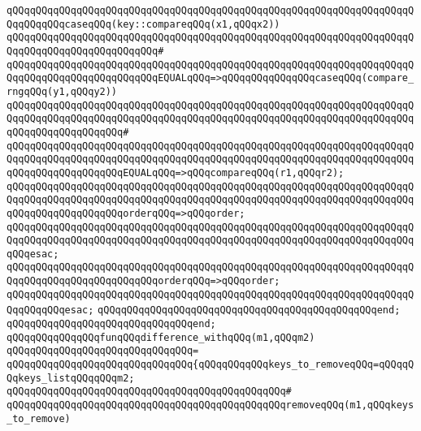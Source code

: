 \verb|qQQqqQQqqQQqqQQqqQQqqQQqqQQqqQQqqQQqqQQqqQQqqQQqqQQqqQQqqQQqqQQqqQQqqQQqqQQqqQQqcaseqQQq(key::compareqQQq(x1,qQQqx2))|\newline
\verb|qQQqqQQqqQQqqQQqqQQqqQQqqQQqqQQqqQQqqQQqqQQqqQQqqQQqqQQqqQQqqQQqqQQqqQQqqQQqqQQqqQQqqQQqqQQqqQQq#|\newline
\verb|qQQqqQQqqQQqqQQqqQQqqQQqqQQqqQQqqQQqqQQqqQQqqQQqqQQqqQQqqQQqqQQqqQQqqQQqqQQqqQQqqQQqqQQqqQQqqQQqEQUALqQQq=>qQQqqQQqqQQqqQQqcaseqQQq(compare_rngqQQq(y1,qQQqy2))|\newline
\verb|qQQqqQQqqQQqqQQqqQQqqQQqqQQqqQQqqQQqqQQqqQQqqQQqqQQqqQQqqQQqqQQqqQQqqQQqqQQqqQQqqQQqqQQqqQQqqQQqqQQqqQQqqQQqqQQqqQQqqQQqqQQqqQQqqQQqqQQqqQQqqQQqqQQqqQQqqQQqqQQq#|\newline
\verb|qQQqqQQqqQQqqQQqqQQqqQQqqQQqqQQqqQQqqQQqqQQqqQQqqQQqqQQqqQQqqQQqqQQqqQQqqQQqqQQqqQQqqQQqqQQqqQQqqQQqqQQqqQQqqQQqqQQqqQQqqQQqqQQqqQQqqQQqqQQqqQQqqQQqqQQqqQQqqQQqEQUALqQQq=>qQQqcompareqQQq(r1,qQQqr2);|\newline
\verb|qQQqqQQqqQQqqQQqqQQqqQQqqQQqqQQqqQQqqQQqqQQqqQQqqQQqqQQqqQQqqQQqqQQqqQQqqQQqqQQqqQQqqQQqqQQqqQQqqQQqqQQqqQQqqQQqqQQqqQQqqQQqqQQqqQQqqQQqqQQqqQQqqQQqqQQqqQQqqQQqorderqQQq=>qQQqorder;|\newline
\verb|qQQqqQQqqQQqqQQqqQQqqQQqqQQqqQQqqQQqqQQqqQQqqQQqqQQqqQQqqQQqqQQqqQQqqQQqqQQqqQQqqQQqqQQqqQQqqQQqqQQqqQQqqQQqqQQqqQQqqQQqqQQqqQQqqQQqqQQqqQQqqQQqesac;|\newline
\newline
\verb|qQQqqQQqqQQqqQQqqQQqqQQqqQQqqQQqqQQqqQQqqQQqqQQqqQQqqQQqqQQqqQQqqQQqqQQqqQQqqQQqqQQqqQQqqQQqqQQqorderqQQq=>qQQqorder;|\newline
\verb|qQQqqQQqqQQqqQQqqQQqqQQqqQQqqQQqqQQqqQQqqQQqqQQqqQQqqQQqqQQqqQQqqQQqqQQqqQQqqQQqesac;|\newline
\verb|qQQqqQQqqQQqqQQqqQQqqQQqqQQqqQQqqQQqqQQqqQQqqQQqend;|\newline
\verb|qQQqqQQqqQQqqQQqqQQqqQQqqQQqqQQqend;|\newline
\newline
\newline
\verb|qQQqqQQqqQQqqQQqfunqQQqdifference_withqQQq(m1,qQQqm2)|\newline
\verb|qQQqqQQqqQQqqQQqqQQqqQQqqQQqqQQq=|\newline
\verb|qQQqqQQqqQQqqQQqqQQqqQQqqQQqqQQq{qQQqqQQqqQQqkeys_to_removeqQQq=qQQqqQQqkeys_listqQQqqQQqm2;|\newline
\verb|qQQqqQQqqQQqqQQqqQQqqQQqqQQqqQQqqQQqqQQqqQQqqQQq#|\newline
\verb|qQQqqQQqqQQqqQQqqQQqqQQqqQQqqQQqqQQqqQQqqQQqqQQqremoveqQQq(m1,qQQqkeys_to_remove)|\newline
